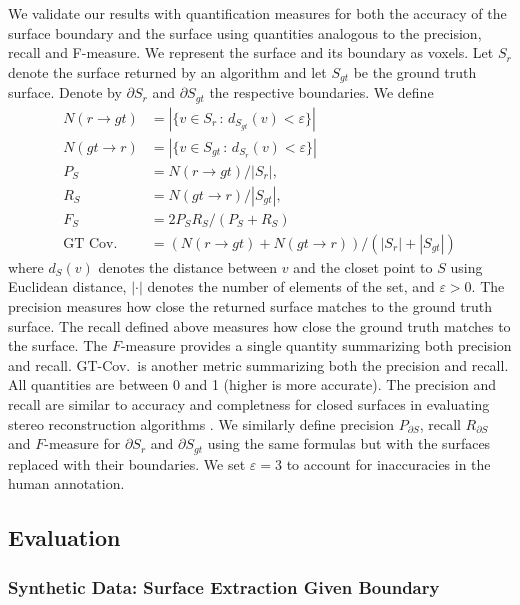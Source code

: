 \documentclass[10pt,journal,compsoc]{IEEEtran}
\begin{document}
We validate our results with quantification measures for both the
accuracy of the surface boundary and the surface using quantities
analogous to the precision, recall and F-measure. We represent the
surface and its boundary as voxels. Let $S_{r}$ denote the surface
returned by an algorithm and let $S_{gt}$ be the ground truth
surface. Denote by $\partial S_{r}$ and $\partial S_{gt}$ the
respective boundaries. We define
\begin{align*}
  N( r\rightarrow gt) &= |\{ v \in S_r \,:\, d_{S_{gt}}(v) <
                        \varepsilon \} | \\
  N( gt\rightarrow r)  &= |\{ v \in S_{gt} \,:\, d_{S_r}(v) <
                         \varepsilon \}| \\
  P_S &= N( r\rightarrow gt)   /  |S_r |, \\
  R_S &= N( gt\rightarrow r) / |S_{gt}|, \\
  F_S &= 2 P_S R_S / (P_S + R_S) \\
  \text{GT Cov.} &=   ( N( r\rightarrow gt) + N( gt\rightarrow r) ) / (  |S_r | +  |S_{gt}| )
\end{align*}
where $d_S(v)$ denotes the distance between $v$ and the closet point
to $S$ using Euclidean distance, $|\cdot|$ denotes the number of
elements of the set, and $\varepsilon > 0$. The precision measures how
close the returned surface matches to the ground truth surface.  The
recall defined above measures how close the ground truth matches to
the surface. The $F$-measure provides a single quantity summarizing
both precision and recall. GT-Cov.~is another metric summarizing both
the precision and recall. All quantities are between 0 and 1 (higher
is more accurate). The precision and recall are similar to accuracy and
completness for closed surfaces in evaluating stereo reconstruction
algorithms \cite{seitz2006comparison}.  We similarly define precision
$P_{\partial S}$, recall $R_{\partial S}$ and $F$-measure for
$\partial S_r$ and $\partial S_{gt}$ using the same formulas but with
the surfaces replaced with their boundaries. We set $\varepsilon = 3$
to account for inaccuracies in the human annotation.


\subsection{Evaluation}

\subsubsection{Synthetic Data: Surface Extraction Given Boundary}
\end{document}

